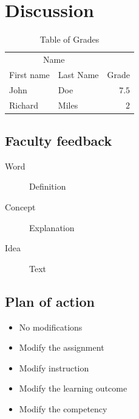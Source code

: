 \documentclass[fleqn,10pt]{SelfArx}\usepackage[]{graphicx}\usepackage[]{color}
\begin{document}
\lipsum[1] %
\lipsum[1]


\section{Discussion}

\lipsum[1] %

\lipsum[1] %

\begin{table}[hbt]
\caption{Table of Grades}
\centering
\begin{tabular}{llr}
\toprule
\multicolumn{2}{c}{Name} \\
\cmidrule(r){1-2}
First name & Last Name & Grade \\
\midrule
John & Doe & $7.5$ \\
Richard & Miles & $2$ \\
\bottomrule
\end{tabular}
\label{tab:label}
\end{table}

\subsection{Faculty feedback}
\lipsum[1] %

\begin{description}
\item[Word] Definition
\item[Concept] Explanation
\item[Idea] Text
\end{description}

\lipsum[1] %

\subsection{Plan of action}
\lipsum[1] %
\begin{itemize}[noitemsep] %
\item No modifications
\item Modify the assignment
\item Modify instruction
\item Modify the learning outcome
\item Modify the competency
\end{itemize}
\end{document}

